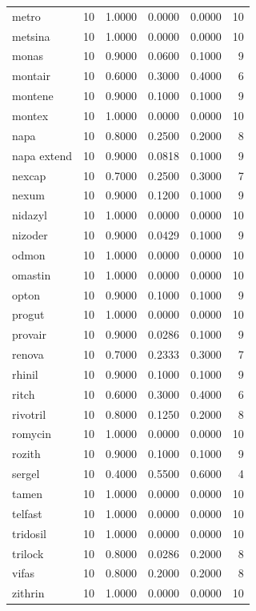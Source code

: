 \begin{longtable}{p{3.0cm}rrrrr}
metro & 10 & 1.0000 & 0.0000 & 0.0000 & 10 \\
metsina & 10 & 1.0000 & 0.0000 & 0.0000 & 10 \\
monas & 10 & 0.9000 & 0.0600 & 0.1000 & 9 \\
montair & 10 & 0.6000 & 0.3000 & 0.4000 & 6 \\
montene & 10 & 0.9000 & 0.1000 & 0.1000 & 9 \\
montex & 10 & 1.0000 & 0.0000 & 0.0000 & 10 \\
napa & 10 & 0.8000 & 0.2500 & 0.2000 & 8 \\
napa extend & 10 & 0.9000 & 0.0818 & 0.1000 & 9 \\
nexcap & 10 & 0.7000 & 0.2500 & 0.3000 & 7 \\
nexum & 10 & 0.9000 & 0.1200 & 0.1000 & 9 \\
nidazyl & 10 & 1.0000 & 0.0000 & 0.0000 & 10 \\
nizoder & 10 & 0.9000 & 0.0429 & 0.1000 & 9 \\
odmon & 10 & 1.0000 & 0.0000 & 0.0000 & 10 \\
omastin & 10 & 1.0000 & 0.0000 & 0.0000 & 10 \\
opton & 10 & 0.9000 & 0.1000 & 0.1000 & 9 \\
progut & 10 & 1.0000 & 0.0000 & 0.0000 & 10 \\
provair & 10 & 0.9000 & 0.0286 & 0.1000 & 9 \\
renova & 10 & 0.7000 & 0.2333 & 0.3000 & 7 \\
rhinil & 10 & 0.9000 & 0.1000 & 0.1000 & 9 \\
ritch & 10 & 0.6000 & 0.3000 & 0.4000 & 6 \\
rivotril & 10 & 0.8000 & 0.1250 & 0.2000 & 8 \\
romycin & 10 & 1.0000 & 0.0000 & 0.0000 & 10 \\
rozith & 10 & 0.9000 & 0.1000 & 0.1000 & 9 \\
sergel & 10 & 0.4000 & 0.5500 & 0.6000 & 4 \\
tamen & 10 & 1.0000 & 0.0000 & 0.0000 & 10 \\
telfast & 10 & 1.0000 & 0.0000 & 0.0000 & 10 \\
tridosil & 10 & 1.0000 & 0.0000 & 0.0000 & 10 \\
trilock & 10 & 0.8000 & 0.0286 & 0.2000 & 8 \\
vifas & 10 & 0.8000 & 0.2000 & 0.2000 & 8 \\
zithrin & 10 & 1.0000 & 0.0000 & 0.0000 & 10 \\
\end{longtable}
\endgroup
